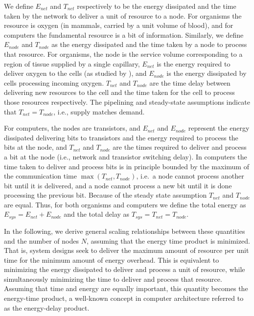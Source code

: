 \documentclass[12pt]{article}
\begin{document}
We define $E_{net}$ and $T_{net}$ respectively to be the energy dissipated and
the time taken by the network to deliver a unit of resource to a node.  For
organisms the resource is oxygen (in mammals, carried by a unit volume of
blood), and for computers the fundamental resource is a bit of information.
Similarly, we define $E_{node}$ and $T_{node}$ as the energy dissipated and the
time taken by a node to process that resource.  For organisms, the node is the
service volume corresponding to a region of tissue supplied by a single
capillary, $E_{net}$ is the energy required to deliver oxygen to the cells (as
studied by \cite{west97}), and $E_{node}$ is the energy dissipated by cells
processing incoming oxygen. $T_{net}$ and
$T_{node}$ are the time delay between delivering new resources to the cell and
the time taken for the cell to process those resources respectively. The
pipelining and steady-state assumptions indicate that $T_{net} = T_{node}$,
i.e., supply matches demand.

For computers, the nodes are transistors, and 
$E_{net}$ and $E_{node}$ represent the energy dissipated delivering bits to
transistors and the energy required to process the bits at the node, and
$T_{net}$ and $T_{node}$ are the times required to deliver and process a bit at
the node (i.e., network and transistor switching delay).  In computers the time
taken to deliver and process bits is in principle bounded by the maximum of the
communication time $\max(T_{net},T_{node})$, i.e.\ a node cannot process
another bit until it is delivered, and a node cannot process a new bit until it
is done processing the previous bit. Because of the steady state assumption $T_{net}$ and $T_{node}$ are equal. Thus, for both organisms and computers we define
the total energy as $E_{sys} = E_{net} + E_{node}$ and the total delay as
$T_{sys}=T_{net} = T_{node}$.

In the following, we derive general scaling relationships between these
quantities and the number of nodes $N$, assuming that the energy time product
is minimized.  That is, system designs seek to deliver the maximum amount of
resource per unit time for the minimum amount of energy overhead.   This is
equivalent to minimizing the energy dissipated to deliver and process a unit of
resource, while simultaneously minimizing the time to deliver and process that
resource.  Assuming that time and energy are equally important, this quantity
becomes the energy-time product, a well-known concept in computer architecture
referred to as the energy-delay product.  
\end{document}
